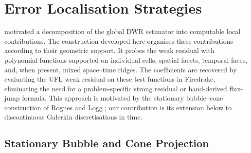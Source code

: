 \section{Error Localisation Strategies}
\label{sec:background-localisation}

 motivated a decomposition of the global DWR estimator into computable local contributions. 
The construction developed here organises these contributions according to their geometric support. It probes the weak residual with polynomial functions supported on individual cells, spatial facets, temporal faces, and, when present, mixed space--time ridges. The coefficients are recovered by evaluating the UFL weak residual on these test functions in Firedrake, eliminating the need for a problem-specific strong residual or hand-derived flux-jump formula. This approach is motivated by the stationary bubble--cone construction of Rognes and Logg \cite{Rognes_Logg_2013}; our contribution is its extension below to discontinuous Galerkin discretisations in time.


\subsection{Stationary Bubble and Cone Projection}
\label{sec:stationary-residual-recovery}

